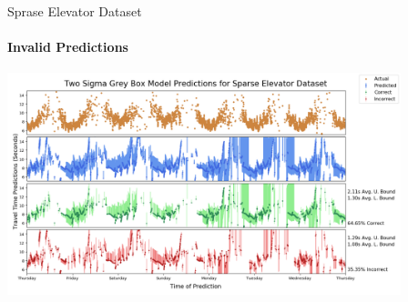 \documentclass{beamer}
\begin{document}
\begin{frame}[t]{Sprase Elevator Dataset}
  \framesubtitle{Invalid Predictions}

  {\includegraphics[width = 4.5in]{images/elevator/two_sigma_grey_box_model_predictions_for_sparse_elevator_dataset.png}}

\end{frame}



%
%
\end{document}
